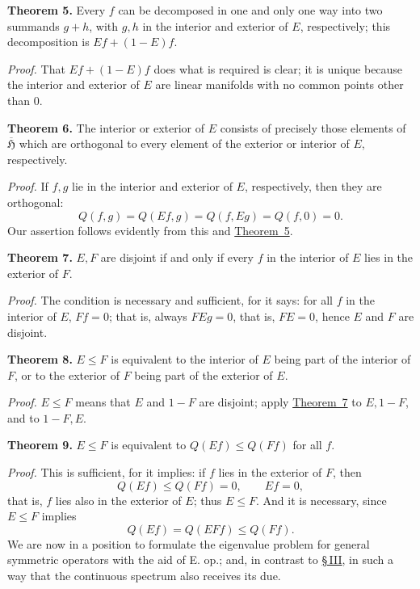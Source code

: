 \documentclass[fontsize=13pt,paper=b5,twoside,bookmarkpackage=false]{scrartcl}
\newcommand{\Sec}[1]{\hyperref[sec:#1]{\S\,#1}}
\begin{document}
\par\medskip\noindent{}\label{thm:VIII:5}\textbf{Theorem 5.}
Every $f$ can be decomposed in one and only one way into two summands $g+h$, with $g,h$ in the interior and exterior of $E$, respectively; this decomposition is $Ef+(1-E)f$.

\par\noindent\textit{Proof.}
That $Ef+(1-E)f$ does what is required is clear; it is unique because the interior and exterior of $E$ are linear manifolds with no common points other than $0$.

\par\medskip\noindent{}\label{thm:VIII:6}\textbf{Theorem 6.}
The interior or exterior of $E$ consists of precisely those elements of $\overline{\mathfrak{H}}$ which are orthogonal to every element of the exterior or interior of $E$, respectively.

\par\noindent\textit{Proof.}
If $f,g$ lie in the interior and exterior of $E$, respectively, then they are orthogonal:
\[
 Q(f,g)=Q(Ef,g)=Q(f,Eg)=Q(f,0)=0.
\]
Our assertion follows evidently from this and \hyperref[thm:VIII:5]{Theorem~5}.

\par\medskip\noindent{}\label{thm:VIII:7}\textbf{Theorem 7.}
$E,F$ are disjoint if and only if every $f$ in the interior of $E$ lies in the exterior of $F$.

\par\noindent\textit{Proof.}
The condition is necessary and sufficient, for it says: for all $f$ in the interior of $E$, $Ff=0$; that is, always $FEg=0$, that is, $FE=0$, hence $E$ and $F$ are disjoint.

\par\medskip\noindent{}\label{thm:VIII:8}\textbf{Theorem 8.}
$E\leq F$ is equivalent to the interior of $E$ being part of the interior of $F$, or to the exterior of $F$ being part of the exterior of $E$.

\par\noindent\textit{Proof.}
$E\leq F$ means that $E$ and $1-F$ are disjoint; apply \hyperref[thm:VIII:7]{Theorem~7} to $E,1-F$, and to $1-F,E$.

\par\medskip\noindent{}\label{thm:VIII:9}\textbf{Theorem 9.}
$E\leq F$ is equivalent to $Q(Ef)\leq Q(Ff)$ for all $f$.

\par\noindent\textit{Proof.}
This is sufficient, for it implies: if $f$ lies in the exterior of $F$, then
\[
 Q(Ef)\leq Q(Ff)=0,\qquad Ef=0,
\]
that is, $f$ lies also in the exterior of $E$; thus $E\leq F$. And it is necessary, since $E\leq F$ implies
\[
 Q(Ef)=Q(EFf)\leq Q(Ff).
\]
We are now in a position to formulate the eigenvalue problem for general symmetric operators with the aid of E. op.; and, in contrast to \Sec{III}, in such a way that the continuous spectrum also receives its due.
\end{document}
